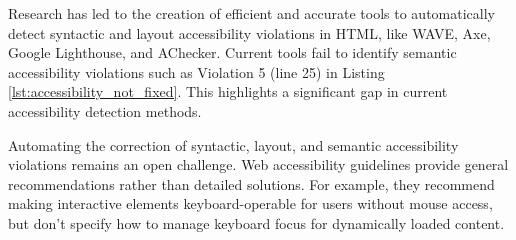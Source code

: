 \documentclass[sigconf, nonacm]{acmart}
\begin{document}
Research has led to the creation of efficient and accurate tools to automatically detect syntactic and layout accessibility violations in HTML, like WAVE, Axe, Google Lighthouse, and AChecker. Current tools fail to identify semantic accessibility violations such as Violation 5 (line 25) in Listing \ref{lst:accessibility_not_fixed}. This highlights a significant gap in current accessibility detection methods. 

Automating the correction of syntactic, layout, and semantic accessibility violations remains an open challenge. Web accessibility guidelines provide general recommendations rather than detailed solutions. For example, they recommend making interactive elements keyboard-operable for users without mouse access, but don't specify how to manage keyboard focus for dynamically loaded content.
\end{document}
